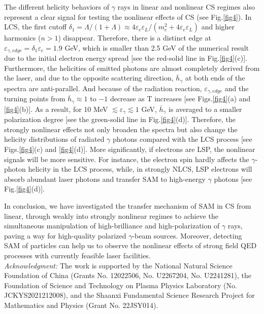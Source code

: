\documentclass[10pt,twocolumn,showpacs,amsmath,amssymb,floatfix,superscriptaddress]{revtex4-2}
\begin{document}
The different helicity behaviors of $\gamma$ rays in linear and nonlinear CS regimes also represent a clear signal for testing the nonlinear effects of CS (see Fig.\ref{fig4}). In LCS, the first cutoff $\delta_1 = \Lambda/(1+\Lambda) \approx 4\varepsilon_{e} \varepsilon_L/(m_e^2+4\varepsilon_{e} \varepsilon_L)$ and higher harmonics ($n > 1$) disappear. Therefore, there is a distinct edge at $\varepsilon_{\gamma,edge}=\delta_1 \varepsilon_{e}=1.9$ GeV, which is smaller than 2.5 GeV of the numerical result due to the initial electron energy spread [see the red-solid line in Fig.\ref{fig4}(c)]. Furthermore, the helicities of emitted photons are almost completely derived  from the laser, and due to the opposite scattering direction, $\overline{h}_\gamma$ at both ends of the spectra are anti-parallel. And because of the radiation reaction, $\varepsilon_{\gamma,edge}$ and the turning points from $\overline{h}_\gamma \approx 1$ to $-1$ decrease as T increases [see Figs.\ref{fig4}(a) and \ref{fig4}(b)]. As a result, for 10 MeV $\lesssim \varepsilon_\gamma \lesssim 1$ GeV, $\overline{h}_\gamma$ is averaged to a smaller polarization degree [see the green-solid line in Fig.\ref{fig4}(d)]. Therefore, the strongly nonlinear effects not only broaden the spectra but also change the helicity distributions of radiated $\gamma$ photons compared with the LCS process [see Figs.\ref{fig4}(c) and \ref{fig4}(d)]. More significantly, if electrons are LSP, the nonlinear signals will be more sensitive. For instance, the electron spin hardly affects the $\gamma$-photon helicity in the LCS process, while, in strongly NLCS, LSP electrons will absorb abundant laser photons and transfer SAM to high-energy $\gamma$ photons [see Fig.\ref{fig4}(d)].
  
In conclusion,  we have investigated the transfer mechanism of SAM in CS from linear, through weakly into strongly nonlinear regimes to achieve the simultaneous manipulation of high-brilliance and high-polarization of $\gamma$ rays, paving a way for high-quality polarized $\gamma$-beam sources. Moreover, detecting SAM of particles can help us to observe the nonlinear effects of strong field QED processes with currently feasible laser facilities.\\

{\emph{Acknowledgment:} The work is supported by the National Natural Science Foundation of China (Grants No. 12022506, No. U2267204, No. U2241281), the Foundation of Science and Technology on Plasma Physics Laboratory (No. JCKYS2021212008), and the Shaanxi Fundamental Science Research Project for Mathematics and Physics (Grant No. 22JSY014).}


\end{document}
